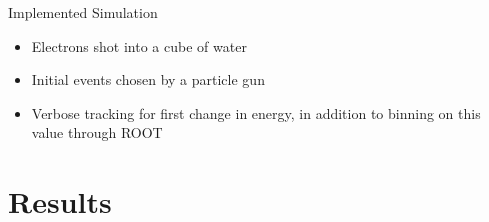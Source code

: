 \documentclass[compress]{beamer}
\begin{document}
\begin{frame}[fragile]{Implemented Simulation}
  \begin{itemize}
     \item Electrons shot into a cube of water
     \item Initial events chosen by a particle gun
     \item Verbose tracking for first change in energy, in addition to binning on this value through ROOT
  \end{itemize}
\end{frame}
\section{Results}
\end{document}
